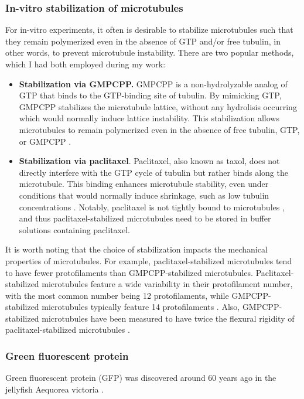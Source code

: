 \subsubsection{In-vitro stabilization of microtubules}
\label{sec:stabilization}
For in-vitro experiments, it often is desirable to stabilize microtubules such that they remain polymerized even in the absence of GTP and/or free tubulin, in other words, to prevent microtubule instability. There are two popular methods, which I had both employed during my work:
\begin{itemize}
	\item \textbf{Stabilization via GMPCPP.} GMPCPP is a non-hydrolyzable analog of GTP that binds to the GTP-binding site of tubulin. By mimicking GTP, GMPCPP stabilizes the microtubule lattice, without any hydrolisis occurring which would normally induce lattice instability. This stabilization allows microtubules to remain polymerized even in the absence of free tubulin, GTP, or GMPCPP \parencite{Hyman1992}.
	\item \textbf{Stabilization via paclitaxel}. Paclitaxel, also known as taxol, does not directly interfere with the GTP cycle of tubulin but rather binds along the microtubule. This binding enhances microtubule stability, even under conditions that would normally induce shrinkage, such as low tubulin concentrations \parencite{SCHIFF1979}. Notably, paclitaxel is not tightly bound to microtubules , and thus paclitaxel-stabilized microtubules need to be stored in buffer solutions containing paclitaxel.
\end{itemize}
It is worth noting that the choice of stabilization impacts the mechanical properties of microtubules. For example, paclitaxel-stabilized microtubules tend to have fewer protofilaments than GMPCPP-stabilized microtubules. Paclitaxel-stabilized microtubules feature a wide variability in their protofilament number, with the most common number being 12 protofilaments, while GMPCPP-stabilized microtubules typically feature 14 protofilaments . Also, GMPCPP-stabilized microtubules have been measured to have twice the flexural rigidity of paclitaxel-stabilized microtubules .

\subsubsection{Green fluorescent protein}
Green fluorescent protein (GFP) was discovered around 60 years ago in the jellyfish Aequorea victoria . 

